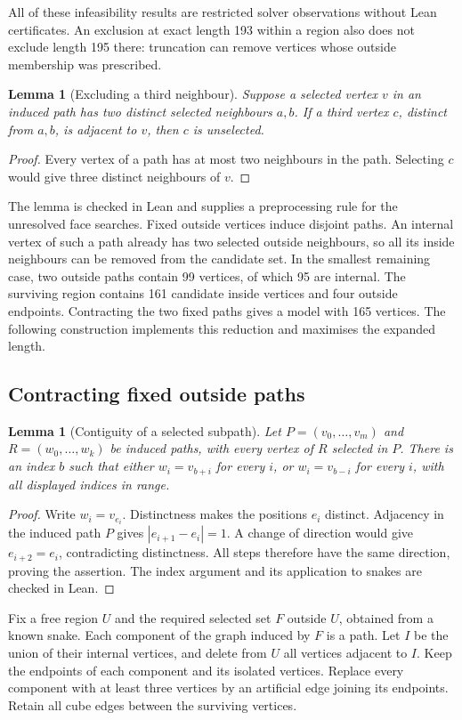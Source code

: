 \documentclass[11pt,a4paper]{article}
\newtheorem{lemma}[theorem]{Lemma}
\theoremstyle{definition}
\theoremstyle{remark}
\begin{document}
All of these infeasibility results are restricted solver observations without Lean certificates. An exclusion at exact length 193 within a region also does not exclude length 195 there: truncation can remove vertices whose outside membership was prescribed.

\begin{lemma}[Excluding a third neighbour]
Suppose a selected vertex $v$ in an induced path has two distinct selected neighbours $a,b$. If a third vertex $c$, distinct from $a,b$, is adjacent to $v$, then $c$ is unselected.
\end{lemma}
\begin{proof}
Every vertex of a path has at most two neighbours in the path. Selecting $c$ would give three distinct neighbours of $v$.
\end{proof}
The lemma is checked in Lean and supplies a preprocessing rule for the unresolved face searches. Fixed outside vertices induce disjoint paths. An internal vertex of such a path already has two selected outside neighbours, so all its inside neighbours can be removed from the candidate set. In the smallest remaining case, two outside paths contain 99 vertices, of which 95 are internal. The surviving region contains 161 candidate inside vertices and four outside endpoints. Contracting the two fixed paths gives a model with 165 vertices. The following construction implements this reduction and maximises the expanded length.

\subsection{Contracting fixed outside paths}
\begin{lemma}[Contiguity of a selected subpath]
Let $P=(v_0,\ldots,v_m)$ and $R=(w_0,\ldots,w_k)$ be induced paths, with every vertex of $R$ selected in $P$. There is an index $b$ such that either $w_i=v_{b+i}$ for every $i$, or $w_i=v_{b-i}$ for every $i$, with all displayed indices in range.
\end{lemma}
\begin{proof}
Write $w_i=v_{e_i}$. Distinctness makes the positions $e_i$ distinct. Adjacency in the induced path $P$ gives $|e_{i+1}-e_i|=1$. A change of direction would give $e_{i+2}=e_i$, contradicting distinctness. All steps therefore have the same direction, proving the assertion. The index argument and its application to snakes are checked in Lean.
\end{proof}

Fix a free region $U$ and the required selected set $F$ outside $U$, obtained from a known snake. Each component of the graph induced by $F$ is a path. Let $I$ be the union of their internal vertices, and delete from $U$ all vertices adjacent to $I$. Keep the endpoints of each component and its isolated vertices. Replace every component with at least three vertices by an artificial edge joining its endpoints. Retain all cube edges between the surviving vertices.
\end{document}
